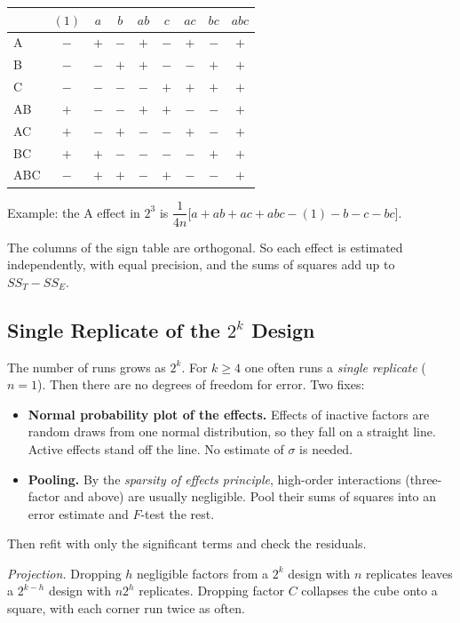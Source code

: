 \begin{center}
\begin{tabular}{l|cccccccc}
\toprule
 & $(1)$ & $a$ & $b$ & $ab$ & $c$ & $ac$ & $bc$ & $abc$\\
\midrule
A & $-$ & $+$ & $-$ & $+$ & $-$ & $+$ & $-$ & $+$\\
B & $-$ & $-$ & $+$ & $+$ & $-$ & $-$ & $+$ & $+$\\
C & $-$ & $-$ & $-$ & $-$ & $+$ & $+$ & $+$ & $+$\\
AB & $+$ & $-$ & $-$ & $+$ & $+$ & $-$ & $-$ & $+$\\
AC & $+$ & $-$ & $+$ & $-$ & $-$ & $+$ & $-$ & $+$\\
BC & $+$ & $+$ & $-$ & $-$ & $-$ & $-$ & $+$ & $+$\\
ABC & $-$ & $+$ & $+$ & $-$ & $+$ & $-$ & $-$ & $+$\\
\bottomrule
\end{tabular}
\end{center}

Example: the A effect in $2^3$ is $\dfrac1{4n}\big[a+ab+ac+abc-(1)-b-c-bc\big]$.

The columns of the sign table are orthogonal. So each effect is estimated independently, with equal precision, and the sums of squares add up to $SS_T-SS_E$.

\subsection{Single Replicate of the $2^k$ Design}

The number of runs grows as $2^k$. For $k\ge4$ one often runs a \emph{single replicate} ($n=1$). Then there are no degrees of freedom for error. Two fixes:
\begin{itemize}
  \item \textbf{Normal probability plot of the effects.} Effects of inactive factors are random draws from one normal distribution, so they fall on a straight line. Active effects stand off the line. No estimate of $\sigma$ is needed.
  \item \textbf{Pooling.} By the \emph{sparsity of effects principle}, high-order interactions (three-factor and above) are usually negligible. Pool their sums of squares into an error estimate and $F$-test the rest.
\end{itemize}
Then refit with only the significant terms and check the residuals.

\emph{Projection.} Dropping $h$ negligible factors from a $2^k$ design with $n$ replicates leaves a $2^{k-h}$ design with $n2^h$ replicates. Dropping factor $C$ collapses the cube onto a square, with each corner run twice as often.

